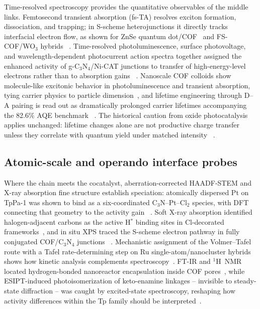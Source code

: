 Time-resolved spectroscopy provides the quantitative observables of the
middle links. Femtosecond transient absorption (fs-TA) resolves exciton
formation, dissociation, and trapping; in S-scheme heterojunctions it
directly tracks interfacial electron flow, as shown for ZnSe quantum
dot/COF~\cite{zhao2024investigating} and FS-COF/WO$_3$ hybrids
~\cite{zhang2025revealing}. Time-resolved photoluminescence, surface
photovoltage, and wavelength-dependent photocurrent action spectra together
assigned the enhanced activity of g-C$_3$N$_4$/Ni-CAT junctions to transfer
of high-energy-level electrons rather than to absorption gains
~\cite{chu2024controlled}. Nanoscale COF colloids show molecule-like
excitonic behavior in photoluminescence and transient absorption, tying
carrier physics to particle dimension~\cite{zhao2024nanoscale}, and
lifetime engineering through D--A pairing is read out as dramatically
prolonged carrier lifetimes accompanying the 82.6\% AQE benchmark
~\cite{li2022covalent}. The historical caution from oxide photocatalysis
applies unchanged: lifetime changes alone are not productive charge
transfer unless they correlate with quantum yield under matched intensity
~\cite{tang2008mechanism,ma2022charge}.

\subsection{Atomic-scale and operando interface probes}

Where the chain meets the cocatalyst, aberration-corrected HAADF-STEM and
X-ray absorption fine structure establish speciation: atomically dispersed
Pt on TpPa-1 was shown to bind as a six-coordinated C$_3$N--Pt--Cl$_2$
species, with DFT connecting that geometry to the activity gain
~\cite{dong2021platinum}. Soft X-ray absorption identified
halogen-adjacent carbons as the active H$^*$ binding sites in Cl-decorated
frameworks~\cite{ma2025engineering}, and in situ XPS traced the S-scheme
electron pathway in fully conjugated COF/C$_3$N$_4$ junctions
~\cite{liu2025in}. Mechanistic assignment of the Volmer--Tafel route with a
Tafel rate-determining step on Ru single-atom/nanocluster hybrids shows how
kinetic analysis complements spectroscopy~\cite{qu2024covalent}. FT-IR and
$^1$H~NMR located hydrogen-bonded nanoreactor encapsulation inside COF
pores~\cite{pan2025reducing}, while ESIPT-induced photoisomerization of
keto-enamine linkages -- invisible to steady-state diffraction -- was caught
by excited-state spectroscopy, reshaping how activity differences within
the Tp family should be interpreted~\cite{weng2023effect}.

